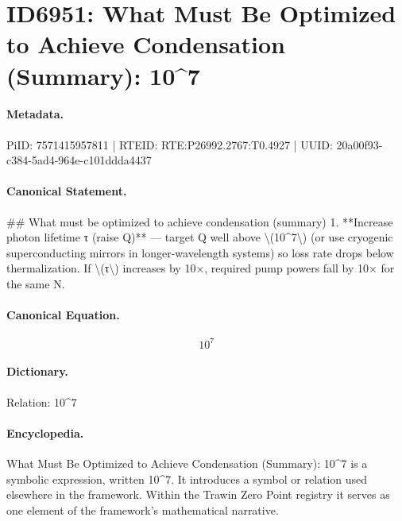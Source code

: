 \section*{ID6951: What Must Be Optimized to Achieve Condensation (Summary): 10\textasciicircum{}7}
\paragraph{Metadata.}
PiID: 7571415957811 | RTEID: RTE:P26992.2767:T0.4927 | UUID: 20a00f93-c384-5ad4-964e-c101ddda4437

\paragraph{Canonical Statement.}
\#\# What must be optimized to achieve condensation (summary) 1. **Increase photon lifetime τ (raise Q)** — target Q well above \textbackslash{}(10\textasciicircum{}7\textbackslash{}) (or use cryogenic superconducting mirrors in longer-wavelength systems) so loss rate drops below thermalization. If \textbackslash{}(τ\textbackslash{}) increases by 10×, required pump powers fall by 10× for the same N.

\paragraph{Canonical Equation.}
\[
10^7
\]

\paragraph{Dictionary.}
Relation: 10\textasciicircum{}7

\paragraph{Encyclopedia.}
What Must Be Optimized to Achieve Condensation (Summary): 10\textasciicircum{}7 is a symbolic expression, written 10\textasciicircum{}7. It introduces a symbol or relation used elsewhere in the framework. Within the Trawin Zero Point registry it serves as one element of the framework's mathematical narrative.
